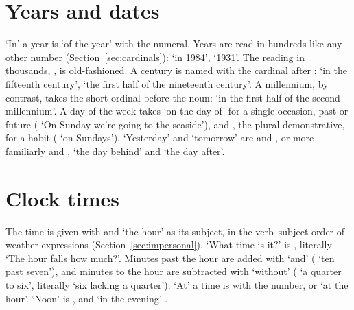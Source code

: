 \section{Years and dates}\label{sec:years}
`In' a year is  `of the year' with the numeral. Years are read in hundreds like any other number (Section~\ref{sec:cardinals}):  `in 1984',  `1931'. The reading in thousands, , is old-fashioned.
A century is named with the cardinal after :  `in the fifteenth century',  `the first half of the nineteenth century'. A millennium, by contrast, takes the short ordinal before the noun:  `in the first half of the second millennium'.
A day of the week takes  `on the day of' for a single occasion, past or future ( `On Sunday we're going to the seaside'), and , the plural demonstrative, for a habit ( `on Sundays'). `Yesterday' and `tomorrow' are  and , or more familiarly  and , `the day behind' and `the day after'.

\section{Clock times}\label{sec:time}
The time is given with  and  `the hour' as its subject, in the verb--subject order of weather expressions (Section~\ref{sec:impersonal}). `What time is it?' is , literally `The hour falls how much?'.
Minutes past the hour are added with  `and' ( `ten past seven'), and minutes to the hour are subtracted with  `without' ( `a quarter to six', literally `six lacking a quarter'). `At' a time is  with the number, or  `at the hour'. `Noon' is , and `in the evening' .

